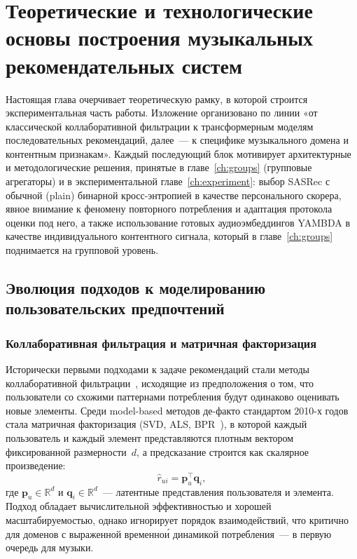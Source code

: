 \chapter{Теоретические и технологические основы построения музыкальных рекомендательных систем}
\label{ch:sequential}

Настоящая глава очерчивает теоретическую рамку, в которой строится экспериментальная часть работы. Изложение организовано по линии «от классической коллаборативной фильтрации к трансформерным моделям последовательных рекомендаций, далее~--- к специфике музыкального домена и контентным признакам». Каждый последующий блок мотивирует архитектурные и методологические решения, принятые в главе~\ref{ch:groups} (групповые агрегаторы) и в экспериментальной главе~\ref{ch:experiment}: выбор SASRec с обычной (plain) бинарной кросс-энтропией в качестве персонального скорера, явное внимание к феномену повторного потребления и адаптация протокола оценки под него, а также использование готовых аудиоэмбеддингов YAMBDA в качестве индивидуального контентного сигнала, который в главе~\ref{ch:groups} поднимается на групповой уровень.

\section{Эволюция подходов к моделированию пользовательских предпочтений}
\label{sec:ch1:evolution}

\subsection{Коллаборативная фильтрация и матричная факторизация}
\label{subsec:ch1:cf-mf}

Исторически первыми подходами к задаче рекомендаций стали методы коллаборативной фильтрации~\cite{koren2009matrix}, исходящие из предположения о том, что пользователи со схожими паттернами потребления будут одинаково оценивать новые элементы. Среди model-based методов де-факто стандартом 2010-х годов стала матричная факторизация (SVD, ALS, BPR~\cite{rendle2009bpr}), в которой каждый пользователь и каждый элемент представляются плотным вектором фиксированной размерности~$d$, а предсказание строится как скалярное произведение:
\begin{equation*}
    \hat{r}_{ui} = \mathbf{p}_u^\top \mathbf{q}_i,
\end{equation*}
где $\mathbf{p}_u \in \mathbb{R}^d$ и $\mathbf{q}_i \in \mathbb{R}^d$~--- латентные представления пользователя и элемента. Подход обладает вычислительной эффективностью и хорошей масштабируемостью, однако игнорирует порядок взаимодействий, что критично для доменов с выраженной временно\'{и} динамикой потребления~--- в первую очередь для музыки.

